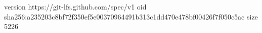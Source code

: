 version https://git-lfs.github.com/spec/v1
oid sha256:a235203c8bf72f350ef5e00370964491b313c1dd470e478bf00426f7f050c5ac
size 5226

